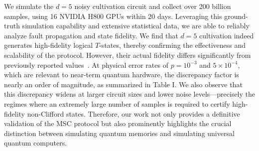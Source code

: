 \documentclass[10pt,conference]{IEEEtran}
\begin{document}
We simulate the $d=5$ noisy cultivation circuit and collect over 200 billion samples, using 16 NVIDIA H800 GPUs within 20 days.
Leveraging this ground-truth simulation capability and extensive statistical data, we are able to reliably analyze fault propagation and state fidelity.
 We find that $d=5$ cultivation indeed generates high-fidelity logical $T$-states, thereby confirming the effectiveness and scalability of the  protocol. 
 However, their actual fidelity differs significantly from previously reported values~\cite{gidney2024magic}.
At physical error rates of $p=10^{-3}$ and $5\times 10^{-4}$, which are relevant to near-term quantum hardware, the discrepancy factor is nearly an order of magnitude, as summarized in Table I. 
We also observe that this discrepancy widens at larger circuit sizes and lower noise levels—precisely the regimes where an extremely large number of samples is required to certify high-fidelity non-Clifford states. 
Therefore, our work not only provides a definitive validation of the MSC protocol but also prominently highlights the crucial distinction between simulating quantum memories and simulating universal quantum computers.

\end{document}
